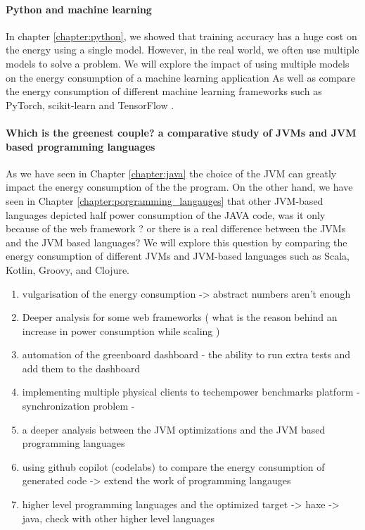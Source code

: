 \paragraph{Python and machine learning}
In chapter \ref{chapter:python}, we showed that training accuracy has a huge cost on the energy using a single model. However, in the real world, we often use multiple models to solve a problem. We will explore the impact of using multiple models on the energy consumption of a machine learning application As well as compare the energy consumption of different machine learning frameworks such as PyTorch, scikit-learn and TensorFlow .



\paragraph{ Which is the greenest couple? a comparative study of JVMs and JVM based programming languages}
As we have seen in Chapter \ref{chapter:java} the choice of the JVM can greatly impact the energy consumption of the the program. On the other hand, we have seen in Chapter \ref{chapter:porgramming_langauges} that other JVM-based languages depicted half power consumption of the JAVA code, was it only because of the web framework ? or there is a real difference between the JVMs and the JVM based languages? We will explore this question by comparing the energy consumption of different JVMs and JVM-based languages such as Scala, Kotlin, Groovy, and Clojure.




\begin{enumerate}
      \item  vulgarisation of the energy consumption -> abstract numbers aren't enough
      \item Deeper analysis for some web frameworks ( what is the reason behind an increase in power consumption while scaling )
      \item automation of the greenboard dashboard - the ability to run extra tests and add them to the dashboard
      \item implementing multiple physical clients to techempower benchmarks platform - synchronization problem -
      \item a deeper analysis between the JVM optimizations and the JVM based programming languages
      \item using github copilot (codelabs) to compare the energy consumption of generated code -> extend the work of programming langauges
      \item higher level programming languages and the optimized target -> haxe -> java, check with other higher level languages

\end{enumerate}


